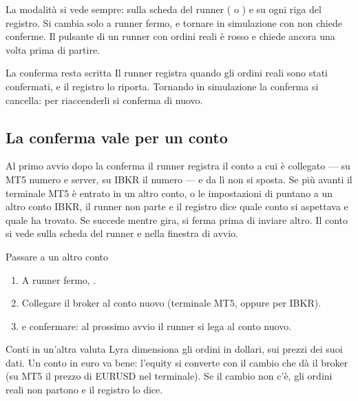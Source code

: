 \noindent
La modalità si vede sempre: sulla scheda del runner ( o
) e su ogni riga del registro. Si cambia solo a runner
fermo, e tornare in simulazione con  non chiede
conferme. Il pulsante  di un runner con ordini reali è rosso
e chiede ancora una volta prima di partire.

\begin{nota}{La conferma resta scritta}
Il runner registra quando gli ordini reali sono stati confermati, e il
registro lo riporta. Tornando in simulazione la conferma si cancella: per
riaccenderli si conferma di nuovo.
\end{nota}

\subsection{La conferma vale per un conto}\label{sez:conto-legato}

Al primo avvio dopo la conferma il runner registra il conto a cui è
collegato --- su MT5 numero e server, su IBKR il numero --- e da lì non si
sposta. Se più avanti il terminale MT5 è entrato in un altro conto, o le
impostazioni di  puntano a un altro conto IBKR, il
runner non parte e il registro dice quale conto si aspettava e quale ha
trovato. Se succede mentre gira, si ferma prima di inviare altro. Il conto
si vede sulla scheda del runner e nella finestra di avvio.

\begin{pratica}{Passare a un altro conto}
\begin{enumerate}
  \item A runner fermo, .
  \item Collegare il broker al conto nuovo (terminale MT5, oppure
         per IBKR).
  \item {} e confermare: al prossimo avvio
        il runner si lega al conto nuovo.
\end{enumerate}
\end{pratica}

\begin{nota}{Conti in un'altra valuta}
Lyra dimensiona gli ordini in dollari, sui prezzi dei suoi dati. Un conto in
euro va bene: l'equity si converte con il cambio che dà il broker (su MT5
il prezzo di EURUSD nel terminale). Se il cambio non c'è, gli ordini reali
non partono e il registro lo dice.
\end{nota}

